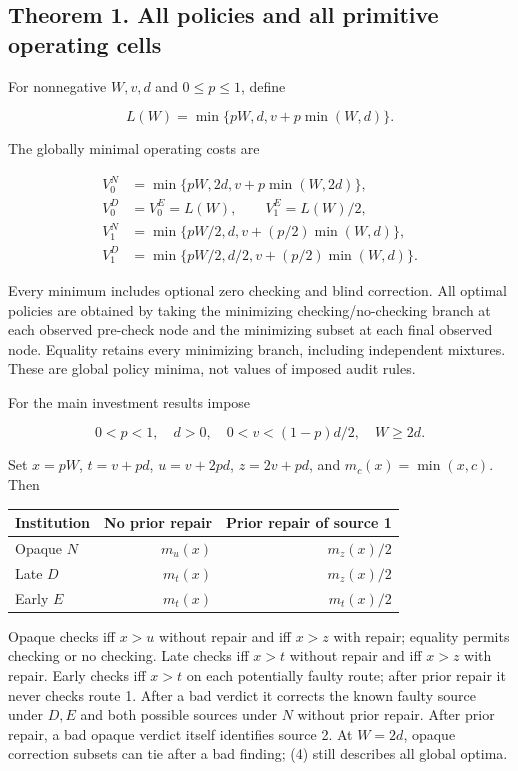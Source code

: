 \documentclass[
  11pt,
  a4paper,
]{article}
\begin{document}
\subsection{Theorem 1. All policies and all primitive operating
cells}\label{theorem-1.-all-policies-and-all-primitive-operating-cells}

For nonnegative \(W,v,d\) and \(0\leq p\leq1\), define

\[L(W)=\min\{pW,d,v+p\min(W,d)\}.\tag{3}\]

The globally minimal operating costs are

\[\begin{aligned}
V_0^N&=\min\{pW,2d,v+p\min(W,2d)\},\\
V_0^D&=V_0^E=L(W),\qquad V_1^E=L(W)/2,\\
V_1^N&=\min\{pW/2,d,v+(p/2)\min(W,d)\},\\
V_1^D&=\min\{pW/2,d/2,v+(p/2)\min(W,d)\}.
\end{aligned}\tag{4}\]

Every minimum includes optional zero checking and blind correction. All
optimal policies are obtained by taking the minimizing
checking/no-checking branch at each observed pre-check node and the
minimizing subset at each final observed node. Equality retains every
minimizing branch, including independent mixtures. These are global
policy minima, not values of imposed audit rules.

For the main investment results impose

\[0<p<1,\quad d>0,\quad 0<v<(1-p)d/2,\quad W\geq2d.\tag{5}\]


Set \(x=pW\), \(t=v+pd\), \(u=v+2pd\), \(z=2v+pd\), and
\(m_c(x)=\min(x,c)\). Then

\begin{longtable}[]{@{}lrr@{}}
\toprule\noalign{}
Institution & No prior repair & Prior repair of source 1 \\
\midrule\noalign{}
\endhead
\bottomrule\noalign{}
\endlastfoot
Opaque \(N\) & \(m_u(x)\) & \(m_z(x)/2\) \\
Late \(D\) & \(m_t(x)\) & \(m_z(x)/2\) \\
Early \(E\) & \(m_t(x)\) & \(m_t(x)/2\) \\
\end{longtable}

Opaque checks iff \(x>u\) without repair and iff \(x>z\) with repair;
equality permits checking or no checking. Late checks iff \(x>t\)
without repair and iff \(x>z\) with repair. Early checks iff \(x>t\) on
each potentially faulty route; after prior repair it never checks route
1. After a bad verdict it corrects the known faulty source under \(D,E\)
and both possible sources under \(N\) without prior repair. After prior
repair, a bad opaque verdict itself identifies source 2. At \(W=2d\),
opaque correction subsets can tie after a bad finding; (4) still
describes all global optima.
\end{document}
